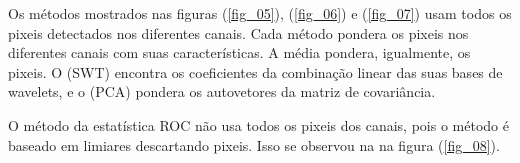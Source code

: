 \documentclass[conference]{IEEEtran}
\begin{document}
Os métodos mostrados nas figuras (\ref{fig_05}), (\ref{fig_06}) e (\ref{fig_07}) usam todos os pixeis detectados nos diferentes canais. Cada método pondera os pixeis nos diferentes canais com suas características. A média pondera, igualmente, os pixeis. O (SWT) encontra os coeficientes da combinação linear das suas bases de wavelets, e o (PCA) pondera os autovetores da matriz de covariância.

O método da estatística ROC não usa todos os pixeis dos canais, pois o método é baseado em limiares descartando pixeis. Isso se observou na na figura (\ref{fig_08}).

\begin{figure}[hbt]
	\centering
     \quad
     \\
     \quad
\end{figure}
\end{document}
